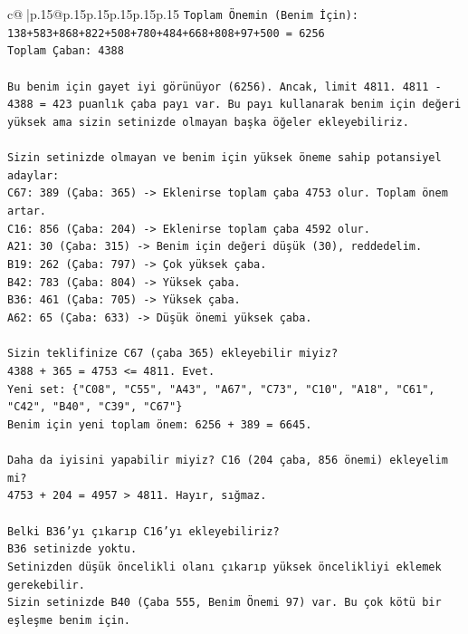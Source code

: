 \documentclass{article}
\begin{document}
{\begin{supertabular}{c@{$\;$}|p{.15\linewidth}@{}p{.15\linewidth}p{.15\linewidth}p{.15\linewidth}p{.15\linewidth}p{.15\linewidth}}
{{{\texttt{Toplam Önemin (Benim İçin): 138+583+868+822+508+780+484+668+808+97+500 = 6256} \\
\texttt{Toplam Çaban: 4388} \\
\\ 
\texttt{Bu benim için gayet iyi görünüyor (6256). Ancak, limit 4811. 4811 {-} 4388 = 423 puanlık çaba payı var. Bu payı kullanarak benim için değeri yüksek ama sizin setinizde olmayan başka öğeler ekleyebiliriz.} \\
\\ 
\texttt{Sizin setinizde olmayan ve benim için yüksek öneme sahip potansiyel adaylar:} \\
\texttt{C67: 389 (Çaba: 365) {-}> Eklenirse toplam çaba 4753 olur. Toplam önem artar.} \\
\texttt{C16: 856 (Çaba: 204) {-}> Eklenirse toplam çaba 4592 olur.} \\
\texttt{A21: 30 (Çaba: 315) {-}> Benim için değeri düşük (30), reddedelim.} \\
\texttt{B19: 262 (Çaba: 797) {-}> Çok yüksek çaba.} \\
\texttt{B42: 783 (Çaba: 804) {-}> Yüksek çaba.} \\
\texttt{B36: 461 (Çaba: 705) {-}> Yüksek çaba.} \\
\texttt{A62: 65 (Çaba: 633) {-}> Düşük önemi yüksek çaba.} \\
\\ 
\texttt{Sizin teklifinize C67 (çaba 365) ekleyebilir miyiz?} \\
\texttt{4388 + 365 = 4753 <= 4811. Evet.} \\
\texttt{Yeni set: \{"C08", "C55", "A43", "A67", "C73", "C10", "A18", "C61", "C42", "B40", "C39", "C67"\}} \\
\texttt{Benim için yeni toplam önem: 6256 + 389 = 6645.} \\
\\ 
\texttt{Daha da iyisini yapabilir miyiz? C16 (204 çaba, 856 önemi) ekleyelim mi?} \\
\texttt{4753 + 204 = 4957 > 4811. Hayır, sığmaz.} \\
\\ 
\texttt{Belki B36'yı çıkarıp C16'yı ekleyebiliriz?} \\
\texttt{B36 setinizde yoktu.} \\
\texttt{Setinizden düşük öncelikli olanı çıkarıp yüksek öncelikliyi eklemek gerekebilir.} \\
\texttt{Sizin setinizde B40 (Çaba 555, Benim Önemi 97) var. Bu çok kötü bir eşleşme benim için.} \\
}}}
\end{supertabular}}
\end{document}
